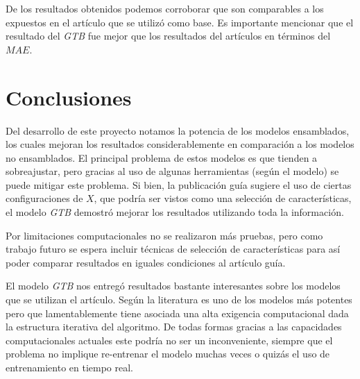 \documentclass[spanish]{article}
\begin{document}
        De los resultados obtenidos podemos corroborar que son comparables a los expuestos en el 
        artículo que se utilizó como base. Es importante mencionar que el resultado del
        \emph{GTB} fue mejor que los resultados del artículos en términos del $MAE$.
  
    
    \section{Conclusiones}
        
      Del desarrollo de este proyecto notamos la potencia de los modelos ensamblados, los cuales
      mejoran los resultados considerablemente en comparación a los modelos no ensamblados. El principal
      problema de estos modelos es que tienden a sobreajustar, pero gracias al uso de algunas herramientas
      (según el modelo) se puede mitigar este problema. Si bien, la publicación guía sugiere el uso de 
      ciertas configuraciones de $X$, que podría ser vistos como una selección de características, el 
      modelo \emph{GTB} demostró mejorar los resultados utilizando toda la información. \medskip

      Por limitaciones computacionales no se realizaron más pruebas, pero como trabajo futuro
      se espera incluir técnicas de selección de características para así poder comparar resultados
      en iguales condiciones al artículo guía. \medskip

      El modelo \emph{GTB} nos entregó resultados bastante interesantes sobre los modelos que se utilizan 
      el artículo. Según la literatura es uno de los modelos más potentes pero que lamentablemente tiene 
      asociada una alta exigencia computacional dada la estructura iterativa del algoritmo. De todas 
      formas gracias a las capacidades computacionales actuales este podría no ser un inconveniente, 
      siempre que el problema no implique re-entrenar el modelo muchas veces o quizás el uso de 
      entrenamiento en tiempo real.

  
  
\end{document}
